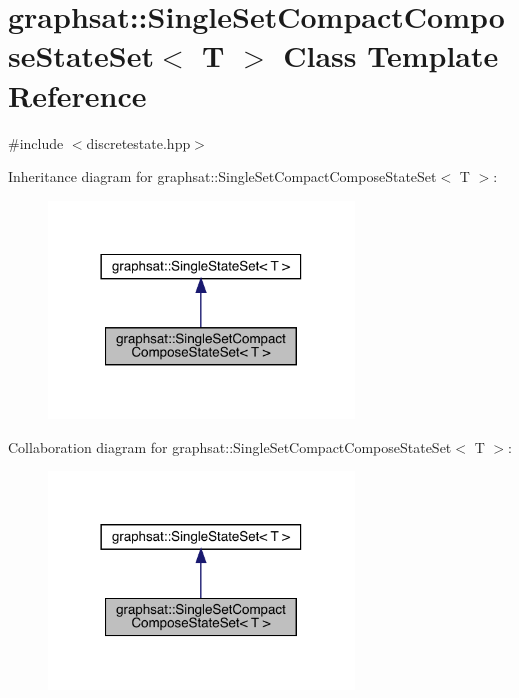 \hypertarget{classgraphsat_1_1_single_set_compact_compose_state_set}{}\section{graphsat\+::Single\+Set\+Compact\+Compose\+State\+Set$<$ T $>$ Class Template Reference}
\label{classgraphsat_1_1_single_set_compact_compose_state_set}


{\ttfamily \#include $<$discretestate.\+hpp$>$}



Inheritance diagram for graphsat\+::Single\+Set\+Compact\+Compose\+State\+Set$<$ T $>$\+:\nopagebreak
\begin{figure}[H]
\begin{center}
\leavevmode
\includegraphics[width=230pt]{classgraphsat_1_1_single_set_compact_compose_state_set__inherit__graph}
\end{center}
\end{figure}


Collaboration diagram for graphsat\+::Single\+Set\+Compact\+Compose\+State\+Set$<$ T $>$\+:\nopagebreak
\begin{figure}[H]
\begin{center}
\leavevmode
\includegraphics[width=230pt]{classgraphsat_1_1_single_set_compact_compose_state_set__coll__graph}
\end{center}
\end{figure}
